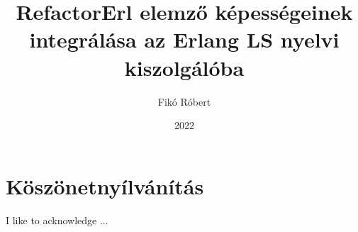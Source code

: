 \documentclass[
	final, %
]{elteikthesis}[2021/09/20]
\title{RefactorErl elemző képességeinek integrálása az Erlang LS nyelvi
kiszolgálóba} %
\date{2022} %
\author{Fikó Róbert}
\affiliation{Egyetemi docens, Egyetemi adjunktus} %
\begin{document}

\listoftodos[\todolabel]


\maketitle



\tableofcontents
\cleardoublepage

\chapter*{Köszönetnyílvánítás}
\thispagestyle{empty}

I like to acknowledge ...

\clearpage


\cleardoublepage


\cleardoublepage


\cleardoublepage


\cleardoublepage



{}
\printbibliography[title=\biblabel]
\cleardoublepage

{}
\listoffigures
\cleardoublepage



{}
\lstlistoflistings
\cleardoublepage

\end{document}
